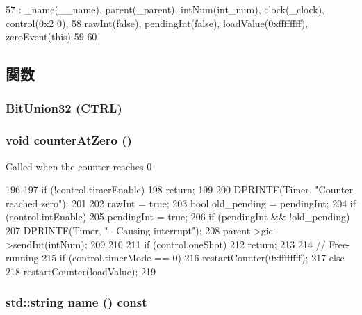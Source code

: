 \begin{DoxyCode}
57     : _name(__name), parent(_parent), intNum(int_num), clock(_clock), control(0x2
      0),
58       rawInt(false), pendingInt(false), loadValue(0xffffffff), zeroEvent(this)
59 {
60 }
\end{DoxyCode}


\subsection{関数}
\hypertarget{classSp804_1_1Timer_a106b41739bf22df3a12501935d39b9f8}{
\subsubsection[{BitUnion32}]{\setlength{\rightskip}{0pt plus 5cm}BitUnion32 (CTRL)}}
\label{classSp804_1_1Timer_a106b41739bf22df3a12501935d39b9f8}
\hypertarget{classSp804_1_1Timer_ab3116a726a55ac899fa28951b13d7453}{
\subsubsection[{counterAtZero}]{\setlength{\rightskip}{0pt plus 5cm}void counterAtZero ()}}
\label{classSp804_1_1Timer_ab3116a726a55ac899fa28951b13d7453}
Called when the counter reaches 0 


\begin{DoxyCode}
196 {
197     if (!control.timerEnable)
198         return;
199 
200     DPRINTF(Timer, "Counter reached zero\n");
201 
202     rawInt = true;
203     bool old_pending = pendingInt;
204     if (control.intEnable)
205         pendingInt = true;
206     if (pendingInt && !old_pending) {
207         DPRINTF(Timer, "-- Causing interrupt\n");
208         parent->gic->sendInt(intNum);
209     }
210 
211     if (control.oneShot)
212         return;
213 
214     // Free-running
215     if (control.timerMode == 0)
216         restartCounter(0xffffffff);
217     else
218         restartCounter(loadValue);
219 }
\end{DoxyCode}
\hypertarget{classSp804_1_1Timer_a37627d5d5bba7f4a8690c71c2ab3cb07}{
\subsubsection[{name}]{\setlength{\rightskip}{0pt plus 5cm}std::string name () const}}
\label{classSp804_1_1Timer_a37627d5d5bba7f4a8690c71c2ab3cb07}



